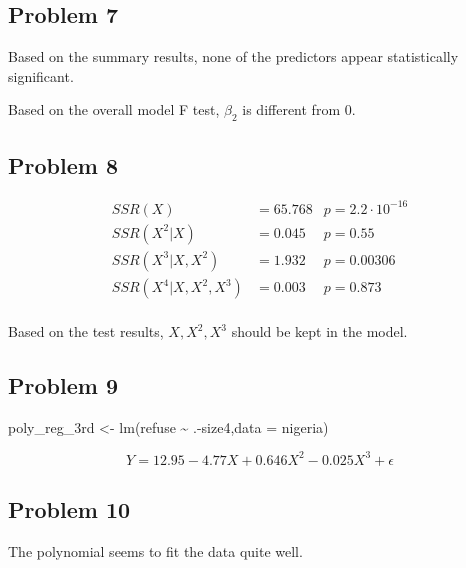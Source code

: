 \documentclass[
  letterpaper,
  DIV=11,
  numbers=noendperiod]{scrartcl}
\newenvironment{Shaded}{\begin{snugshade}}{\end{snugshade}}
\newcommand{\AttributeTok}[1]{\textcolor[rgb]{0.40,0.45,0.13}{#1}}
\newcommand{\FunctionTok}[1]{\textcolor[rgb]{0.28,0.35,0.67}{#1}}
\newcommand{\NormalTok}[1]{\textcolor[rgb]{0.00,0.23,0.31}{#1}}
\newcommand{\OtherTok}[1]{\textcolor[rgb]{0.00,0.23,0.31}{#1}}
\newcommand{\SpecialCharTok}[1]{\textcolor[rgb]{0.37,0.37,0.37}{#1}}
\begin{document}
\hypertarget{problem-7}{%
\subsection{Problem 7}\label{problem-7}}

Based on the summary results, none of the predictors appear
statistically significant.

Based on the overall model F test, \(\beta_2\) is different from 0.

\hypertarget{problem-8}{%
\subsection{Problem 8}\label{problem-8}}

\[
\begin{aligned}
SSR(X) &= 65.768 &p = 2.2 \cdot 10^{-16}\\
SSR(X^2 | X) &= 0.045  &p = 0.55\\
SSR(X^3|X, X^2) &= 1.932 &p= 0.00306\\
SSR(X^4|X, X^2, X^3) &= 0.003 &p= 0.873\\
\end{aligned}
\]

Based on the test results, \(X, X^2, X^3\) should be kept in the model.

\hypertarget{problem-9}{%
\subsection{Problem 9}\label{problem-9}}

\begin{Shaded}
\begin{Highlighting}[]
\NormalTok{poly\_reg\_3rd }\OtherTok{\textless{}{-}} \FunctionTok{lm}\NormalTok{(refuse }\SpecialCharTok{\textasciitilde{}}\NormalTok{ .}\SpecialCharTok{{-}}\NormalTok{size4,}\AttributeTok{data =}\NormalTok{ nigeria)}
\end{Highlighting}
\end{Shaded}

\[Y = 12.95 - 4.77X + 0.646X^2 - 0.025X^3 + \epsilon\]

\hypertarget{problem-10}{%
\subsection{Problem 10}\label{problem-10}}

The polynomial seems to fit the data quite well.
\end{document}
